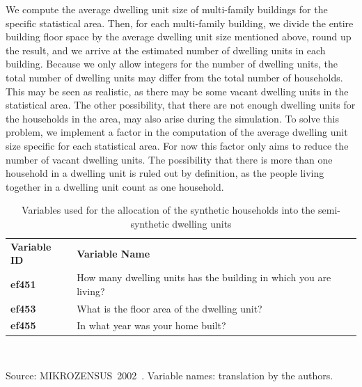 \documentclass[11pt]{IJM-article}
\begin{document}
We compute the average dwelling unit size of multi-family buildings for the
specific statistical area. Then, for each multi-family building, we divide the
entire building floor space by the average dwelling unit size mentioned above,
round up the result, and we arrive at the estimated number of dwelling units in
each building. Because we only allow integers for the number of dwelling units,
the total number of dwelling units may differ from the total number of
households. This may be seen as realistic, as there may be some vacant dwelling
units in the statistical area. The other possibility, that there are not enough
dwelling units for the households in the area, may also arise during the
simulation. To solve this problem, we implement a factor in the computation of
the average dwelling unit size specific for each statistical area. For now this
factor only aims to reduce the number of vacant dwelling units. The possibility
that there is more than one household in a dwelling unit is ruled out by
definition, as the people living together in a dwelling unit count as one
household.\\

\begin{table}[htb] 
    \centering 
    \caption[Variables used for the allocation of households into dwelling 
    units]{Variables used for the allocation of the synthetic households into 
    the semi-synthetic dwelling units}
    \label{tab:3} 
    \begin{tabular}{l l} 
        \addlinespace \toprule
        \multicolumn{2}{l}{\textbf{Living standard of the household} }\\ 
        \midrule
        \textbf{Variable ID} & \textbf{Variable Name} \\ 
        \textbf{ef451} & How many dwelling units has the building in which you 
            are living?\\ 
        \textbf{ef453} & What is the floor area of the dwelling unit?\\ 
        \textbf{ef455} & In what year was your home built?\\ 
        \bottomrule 
    \end{tabular}\\ 
    \begin{flushright}
        \begin{footnotesize} 
            Source: MIKROZENSUS~2002~\cite{StatistischesBundesamt.2002}. 
            Variable names: translation by the authors.\\ 
        \end{footnotesize} 
    \end{flushright} 
\end{table}
\end{document}
